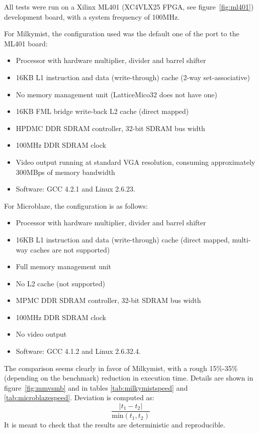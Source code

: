 \documentclass[a4paper,11pt]{kthesis}
\begin{document}
All tests were run on a Xilinx ML401 (XC4VLX25 FPGA, see figure~\ref{fig:ml401}) development board, with a system frequency of 100MHz.

For Milkymist, the configuration used was the default one of the port to the ML401 board:
\begin{itemize}
\item Processor with hardware multiplier, divider and barrel shifter
\item 16KB L1 instruction and data (write-through) cache (2-way set-associative)
\item No memory management unit (LatticeMico32 does not have one)
\item 16KB FML bridge write-back L2 cache (direct mapped)
\item HPDMC DDR SDRAM controller, 32-bit SDRAM bus width
\item 100MHz DDR SDRAM clock
\item Video output running at standard VGA resolution, consuming approximately 300MBps of memory bandwidth
\item Software: GCC 4.2.1 and Linux 2.6.23.
\end{itemize}

For Microblaze, the configuration is as follows:
\begin{itemize}
\item Processor with hardware multiplier, divider and barrel shifter
\item 16KB L1 instruction and data (write-through) cache (direct mapped, multi-way caches are not supported)
\item Full memory management unit
\item No L2 cache (not supported)
\item MPMC DDR SDRAM controller, 32-bit SDRAM bus width
\item 100MHz DDR SDRAM clock
\item No video output
\item Software: GCC 4.1.2 and Linux 2.6.32.4.
\end{itemize}

The comparison seems clearly in favor of Milkymist, with a rough 15\%-35\% (depending on the benchmark) reduction in execution time. Details are shown in figure~\ref{fig:mmvsmb} and in tables \ref{tab:milkymistspeed} and \ref{tab:microblazespeed}. Deviation is computed as:
\begin{equation}
\frac{|t_{1}-t_{2}|}{\textrm{min}(t_{1}, t_{2})}
\end{equation}
It is meant to check that the results are deterministic and reproducible.
\end{document}
